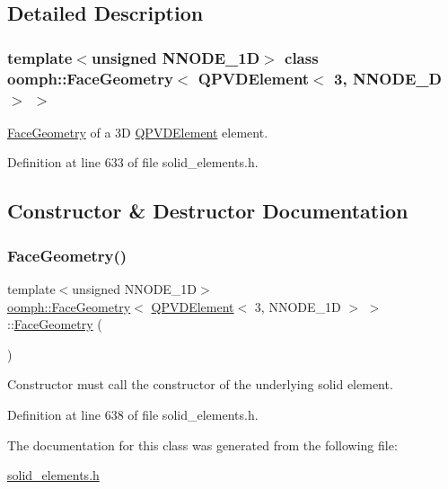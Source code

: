 \subsection{Detailed Description}
\subsubsection*{template$<$unsigned N\+N\+O\+D\+E\+\_\+1D$>$\newline
class oomph\+::\+Face\+Geometry$<$ Q\+P\+V\+D\+Element$<$ 3, N\+N\+O\+D\+E\+\_\+D $>$ $>$}

\hyperlink{classoomph_1_1FaceGeometry}{Face\+Geometry} of a 3D \hyperlink{classoomph_1_1QPVDElement}{Q\+P\+V\+D\+Element} element. 

Definition at line 633 of file solid\+\_\+elements.\+h.



\subsection{Constructor \& Destructor Documentation}
\mbox{\label{classoomph_1_1FaceGeometry_3_01QPVDElement_3_013_00_01NNODE__1D_01_4_01_4_a8b150ea61a2e17414615e693e1dc8bbc}} 
\subsubsection{\texorpdfstring{Face\+Geometry()}{FaceGeometry()}}
{\footnotesize\ttfamily template$<$unsigned N\+N\+O\+D\+E\+\_\+1D$>$ \\
\hyperlink{classoomph_1_1FaceGeometry}{oomph\+::\+Face\+Geometry}$<$ \hyperlink{classoomph_1_1QPVDElement}{Q\+P\+V\+D\+Element}$<$ 3, N\+N\+O\+D\+E\+\_\+1D $>$ $>$\+::\hyperlink{classoomph_1_1FaceGeometry}{Face\+Geometry} (\begin{DoxyParamCaption}{ }\end{DoxyParamCaption})\hspace{0.3cm}{\ttfamily [inline]}}



Constructor must call the constructor of the underlying solid element. 



Definition at line 638 of file solid\+\_\+elements.\+h.



The documentation for this class was generated from the following file\+:\begin{DoxyCompactItemize}
\item 
\hyperlink{solid__elements_8h}{solid\+\_\+elements.\+h}\end{DoxyCompactItemize}
